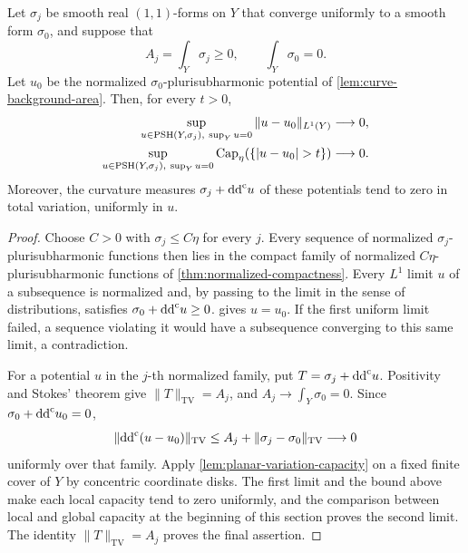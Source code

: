 \begin{theorem}\label{thm:curve-zero-area-collapse}
Let $\sigma_j$ be smooth real $(1,1)$-forms on $Y$ that converge uniformly to a smooth form $\sigma_0$, and suppose that
\[
 A_j=\int_Y\sigma_j\geq0,\qquad \int_Y\sigma_0=0.
\]
Let $u_0$ be the normalized $\sigma_0$-plurisubharmonic potential of \cref{lem:curve-background-area}. Then, for every $t>0$,
\[
 \begin{aligned}
 \sup_{u\in\PSH(Y,\sigma_j),\ \sup_Yu=0}\|u-u_0\|_{L^1(Y)}&\longrightarrow0,\\
 \sup_{u\in\PSH(Y,\sigma_j),\ \sup_Yu=0}
       \operatorname{Cap}_\eta(\{|u-u_0|>t\})&\longrightarrow0.
 \end{aligned}
\]
Moreover, the curvature measures $\sigma_j+\mathrm{dd}^{\mathrm{c}} u$ of these potentials tend to zero in total variation, uniformly in $u$.
\end{theorem}
\begin{proof}
Choose $C>0$ with $\sigma_j\leq C\eta$ for every $j$. Every sequence of normalized $\sigma_j$-plurisubharmonic functions then lies in the compact family of normalized $C\eta$-plurisubharmonic functions of \cref{thm:normalized-compactness}. Every $L^1$ limit $u$ of a subsequence is normalized and, by passing to the limit in the sense of distributions, satisfies $\sigma_0+\mathrm{dd}^{\mathrm{c}} u\geq0$.  gives $u=u_0$. If the first uniform limit failed, a sequence violating it would have a subsequence converging to this same limit, a contradiction.

For a potential $u$ in the $j$-th normalized family, put $T=\sigma_j+\mathrm{dd}^{\mathrm{c}} u$. Positivity and Stokes' theorem give $\|T\|_{\mathrm{TV}}=A_j$, and $A_j\to\int_Y\sigma_0=0$. Since $\sigma_0+\mathrm{dd}^{\mathrm{c}} u_0=0$,
\[
 \|\mathrm{dd}^{\mathrm{c}}(u-u_0)\|_{\mathrm{TV}}
 \leq A_j+\|\sigma_j-\sigma_0\|_{\mathrm{TV}}\longrightarrow0
\]
uniformly over that family. Apply \cref{lem:planar-variation-capacity} on a fixed finite cover of $Y$ by concentric coordinate disks. The first limit and the bound above make each local capacity tend to zero uniformly, and the comparison between local and global capacity at the beginning of this section proves the second limit. The identity $\|T\|_{\mathrm{TV}}=A_j$ proves the final assertion.
\end{proof}
